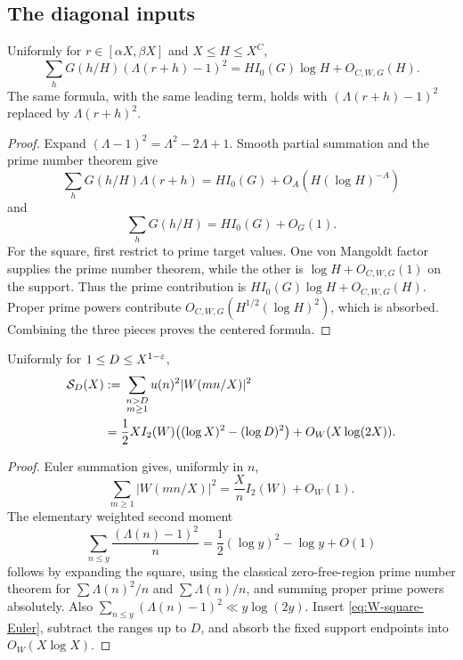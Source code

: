 \subsection{The diagonal inputs}

\begin{lemma}
\label{lem:target-second-moment}
Uniformly for $r\in[\alpha X,\beta X]$ and $X\leq H\leq X^C$,
\begin{equation}
 \sum_hG(h/H)(\Lambda(r+h)-1)^2
 =H I_0(G)\log H+O_{C,W,G}(H).
 \label{eq:target-second-moment}
\end{equation}
The same formula, with the same leading term, holds with
$(\Lambda(r+h)-1)^2$ replaced by $\Lambda(r+h)^2$.
\end{lemma}

\begin{proof}
Expand $(\Lambda-1)^2=\Lambda^2-2\Lambda+1$.  Smooth partial summation and
the prime number theorem give
\[
 \sum_hG(h/H)\Lambda(r+h)=H I_0(G)+O_A(H(\log H)^{-A})
\]
and
\[
 \sum_hG(h/H)=H I_0(G)+O_G(1).
\]
For the square, first restrict to prime target values.  One von Mangoldt
factor supplies the prime number theorem, while the other is
$\log H+O_{C,W,G}(1)$ on the support.  Thus the prime contribution is
$H I_0(G)\log H+O_{C,W,G}(H)$.  Proper prime powers contribute
$O_{C,W,G}(H^{1/2}(\log H)^2)$, which is absorbed.  Combining the three
pieces proves the centered formula.
\end{proof}

\begin{lemma}
\label{lem:source-diagonal}
Uniformly for $1\leq D\leq X^{1-\varepsilon}$,
\begin{equation}
 \begin{aligned}
 \mathcal S_D(X)
 &:={}
 \sum_{\substack{n>D\\m\geq1}}
 u(n)^2|W(mn/X)|^2\\
 &=\frac12X I_2(W)
 \bigl((\log X)^2-(\log D)^2\bigr)
 +O_W(X\log(2X)).
 \end{aligned}
 \label{eq:source-diagonal}
\end{equation}
\end{lemma}

\begin{proof}
Euler summation gives, uniformly in $n$,
\begin{equation}
 \sum_{m\geq1}|W(mn/X)|^2
 =\frac Xn I_2(W)+O_W(1).
 \label{eq:W-square-Euler}
\end{equation}
The elementary weighted second moment
\begin{equation}
 \sum_{n\leq y}\frac{(\Lambda(n)-1)^2}{n}
 =\frac12(\log y)^2-\log y+O(1)
 \label{eq:source-weighted-second-moment}
\end{equation}
follows by expanding the square, using the classical zero-free-region
prime number theorem for
$\sum\Lambda(n)^2/n$ and $\sum\Lambda(n)/n$, and summing proper prime
powers absolutely.  Also
$\sum_{n\leq y}(\Lambda(n)-1)^2\ll y\log(2y)$.  Insert
\eqref{eq:W-square-Euler}, subtract the ranges up to $D$, and absorb the
fixed support endpoints into $O_W(X\log X)$.
\end{proof}

